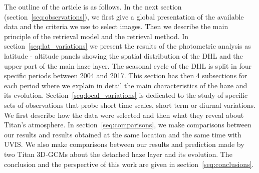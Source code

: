 The outline of the article is as follows. In the next section (section~\ref{seq:observations}), we first give a global presentation of
the available data and the criteria we use to select images.
Then we describe the main principle of the retrieval model and the retrieval method.
In section~\ref{seq:lat_variations} we present the results of the photometric analysis as latitude -
altitude panels showing the spatial distribution of the DHL and the upper part of the main haze layer.
The seasonal cycle of the DHL is split in four specific periods between 2004 and 2017.
This section has then 4 subsections for each period where we explain in detail the main characteristics of the haze and
its evolution.
Section~\ref{seq:local_variations} is dedicated to the study of specific sets of observations that probe short time scales,
short term or diurnal variations. We first describe how the data were selected and then what they reveal about Titan's atmosphere.
In section~\ref{seq:comparisons}, we make comparisons between our results and results obtained at the same location and the same time with UVIS.
We also make comparisons between our results and prediction made by two Titan 3D-GCMs about the detached haze layer and its evolution.
The conclusion and the perspective of this work are given in section~\ref{seq:conclusions}.
